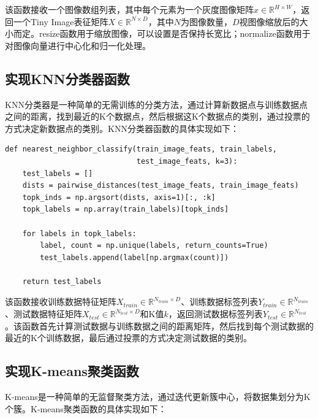 该函数接收一个图像数组列表，其中每个元素为一个灰度图像矩阵$x\in\mathbb{R}^{H\times W}$，返回一个Tiny Image表征矩阵$X\in\mathbb{R}^{N\times D}$，其中$N$为图像数量，$D$视图像缩放后的大小而定。resize函数用于缩放图像，可以设置是否保持长宽比；normalize函数用于对图像向量进行中心化和归一化处理。

\subsection{实现KNN分类器函数}

KNN分类器是一种简单的无需训练的分类方法，通过计算新数据点与训练数据点之间的距离，找到最近的K个数据点，然后根据这K个数据点的类别，通过投票的方式决定新数据点的类别。KNN分类器函数的具体实现如下：

\begin{lstlisting}[style=Python]
def nearest_neighbor_classify(train_image_feats, train_labels,
                              test_image_feats, k=3):
    test_labels = []
    dists = pairwise_distances(test_image_feats, train_image_feats)
    topk_inds = np.argsort(dists, axis=1)[:, :k]
    topk_labels = np.array(train_labels)[topk_inds]

    for labels in topk_labels:
        label, count = np.unique(labels, return_counts=True)
        test_labels.append(label[np.argmax(count)])
    
    return test_labels
\end{lstlisting}

该函数接收训练数据特征矩阵$X_{train}\in\mathbb{R}^{N_{train}\times D}$、训练数据标签列表$Y_{train}\in\mathbb{R}^{N_{train}}$、测试数据特征矩阵$X_{test}\in\mathbb{R}^{N_{test}\times D}$和K值$k$，返回测试数据标签列表$Y_{test}\in\mathbb{R}^{N_{test}}$。该函数首先计算测试数据与训练数据之间的距离矩阵，然后找到每个测试数据的最近的K个训练数据，最后通过投票的方式决定测试数据的类别。

\subsection{实现K-means聚类函数}

K-means是一种简单的无监督聚类方法，通过迭代更新簇中心，将数据集划分为K个簇。K-means聚类函数的具体实现如下：

